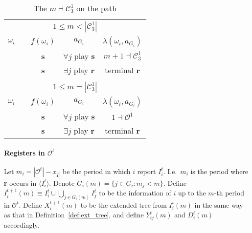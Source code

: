 \documentclass[12pt,letter]{article}
\newcommand{\Kappa}{\mathcal{C}}
\newcommand{\Omicron}{\mathcal{O}}
\theoremstyle{definition}
\theoremstyle{remark}
\theoremstyle{claim}
\begin{document}
\begin{table}[!htbp]
\caption{The $m\dashv\Kappa^1_{3}$ on the path}
\label{table:eqm_path_k03}
\begin{center}
\begin{tabular}{c c | c | c | c}
\multicolumn{5}{c}{$1\leq m < |\Kappa^1_3|$}\\
$\omega_i$ 	 & 	   &	$f(\omega_i)$  &	$a_{G_i}$ & $\lambda(\omega_i,a_{G_i})$ \\
\hline
\hline
  	&	& \textbf{s} & $\forall j$ play $\textbf{s}$ 	& $m+1\dashv \Kappa^1_{3}$\\
  	&  & \textbf{s}  &  $\exists j$ play $\textbf{r}$  	& terminal \textbf{r}\\
\hline
\\
\multicolumn{5}{c}{$1\leq m = |\Kappa^1_3|$}\\
$\omega_i$ 	 & 	   &	$f(\omega_i)$  &	$a_{G_i}$ & $\lambda(\omega_i,a_{G_i})$ \\
\hline
\hline
  	& 	& \textbf{s} & $\forall j$ play $\textbf{s}$ 	& $1\dashv \Omicron^1$\\
  	&  & \textbf{s}  &  $\exists j$ play $\textbf{r}$  	& terminal \textbf{r}\\
\hline
\end{tabular}
\end{center}
\end{table}



\clearpage

\paragraph{Registers in $\Omicron^t$}
Let $m_i=|\Omicron^t|-x_{I^t_i}$ be the period in which $i$ report $I^t_i$. I.e.~$m_i$ is the period where \textbf{r} occurs in $\langle I^t_i \rangle$. 
Denote $G_i(m)=\{j\in G_i: m_j<m\}$. Define $I^{t+1}_i(m)\equiv I^t_i\cup\bigcup_{j\in G_i(m)}I^t_j$ to be the information of $i$ up to the $m$-th period in $\Omicron^t$. 
Define $X^{t+1}_i(m)$ to be the extended tree from $I^t_i(m)$ in the same way as that in Definition~\ref{def:ext_tree}, and define $Y^t_{ij}(m)$ and $D^t_i(m)$ accordingly.
\end{document}
